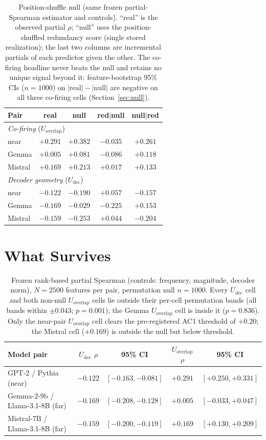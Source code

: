 \documentclass[11pt]{article}
\begin{document}
\begin{table}[t]\centering\small
\begin{tabular}{lcccc}
\toprule
Pair & real & null & red$\mid$null & null$\mid$red \\
\midrule
\multicolumn{5}{l}{\emph{Co-firing} ($U_{\text{overlap}}$)}\\
near & $+0.291$ & $+0.382$ & $-0.035$ & $+0.261$ \\
Gemma & $+0.005$ & $+0.081$ & $-0.086$ & $+0.118$ \\
Mistral & $+0.169$ & $+0.213$ & $+0.017$ & $+0.133$ \\
\midrule
\multicolumn{5}{l}{\emph{Decoder geometry} ($U_{\text{dec}}$)}\\
near & $-0.122$ & $-0.190$ & $+0.057$ & $-0.157$ \\
Gemma & $-0.169$ & $-0.029$ & $-0.225$ & $+0.153$ \\
Mistral & $-0.159$ & $-0.253$ & $+0.044$ & $-0.204$ \\
\bottomrule
\end{tabular}
\caption{Position-shuffle null (same frozen partial-Spearman estimator and controls). ``real'' is the
observed partial $\rho$; ``null'' uses the position-shuffled redundancy score (single stored
realization); the last two columns are incremental partials of each predictor given the other. The
co-firing headline never beats the null and retains no unique signal beyond it: feature-bootstrap
$95\%$ CIs ($n{=}1000$) on $|\text{real}|-|\text{null}|$ are negative on all three co-firing cells
(Section~\ref{sec:null}).}
\label{tab:null}
\end{table}

\section{What Survives}
\label{sec:survives}
\begin{table}[t]\centering
\begin{tabular}{lcccc}
\toprule
Model pair & $U_{\text{dec}}$ $\rho$ & 95\% CI & $U_{\text{overlap}}$ $\rho$ & 95\% CI \\
\midrule
GPT-2 / Pythia (near) & $-0.122$ & $[-0.163,-0.081]$ & $+0.291$ & $[+0.250,+0.331]$ \\
Gemma-2-9b / Llama-3.1-8B (far) & $-0.169$ & $[-0.208,-0.128]$ & $+0.005$ & $[-0.033,+0.047]$ \\
Mistral-7B / Llama-3.1-8B (far) & $-0.159$ & $[-0.200,-0.119]$ & $+0.169$ & $[+0.130,+0.209]$ \\
\bottomrule
\end{tabular}
\caption{Frozen rank-based partial Spearman (controls: frequency, magnitude, decoder norm), $N{=}2500$
features per pair, permutation null $n{=}1000$. Every $U_{\text{dec}}$ cell and both non-null
$U_{\text{overlap}}$ cells lie outside their per-cell permutation bands (all bands within
$\pm0.043$; $p=0.001$); the Gemma
$U_{\text{overlap}}$ cell is inside it ($p=0.836$). Only the near-pair $U_{\text{overlap}}$ cell clears
the pre-registered AC1 threshold of $+0.20$; the Mistral cell ($+0.169$) is outside the null but below
threshold.}
\label{tab:main}
\end{table}
\end{document}
